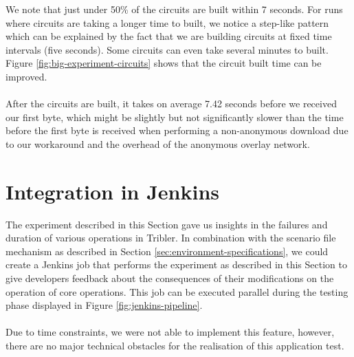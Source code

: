 We note that just under 50\% of the circuits are built within 7 seconds. For runs where circuits are taking a longer time to built, we notice a step-like pattern which can be explained by the fact that we are building circuits at fixed time intervals (five seconds). Some circuits can even take several minutes to built. Figure \ref{fig:big-experiment-circuits} shows that the circuit built time can be improved.\\\\
After the circuits are built, it takes on average 7.42 seconds before we received our first byte, which might be slightly but not significantly slower than the time before the first byte is received when performing a non-anonymous download due to our workaround and the overhead of the anonymous overlay network.

\section{Integration in Jenkins}
The experiment described in this Section gave us insights in the failures and duration of various operations in Tribler. In combination with the scenario file mechanism as described in Section \ref{sec:environment-specifications}, we could create a Jenkins job that performs the experiment as described in this Section to give developers feedback about the consequences of their modifications on the operation of core operations. This job can be executed parallel during the testing phase displayed in Figure \ref{fig:jenkins-pipeline}.\\\\
 Due to time constraints, we were not able to implement this feature, however, there are no major technical obstacles for the realisation of this application test.
